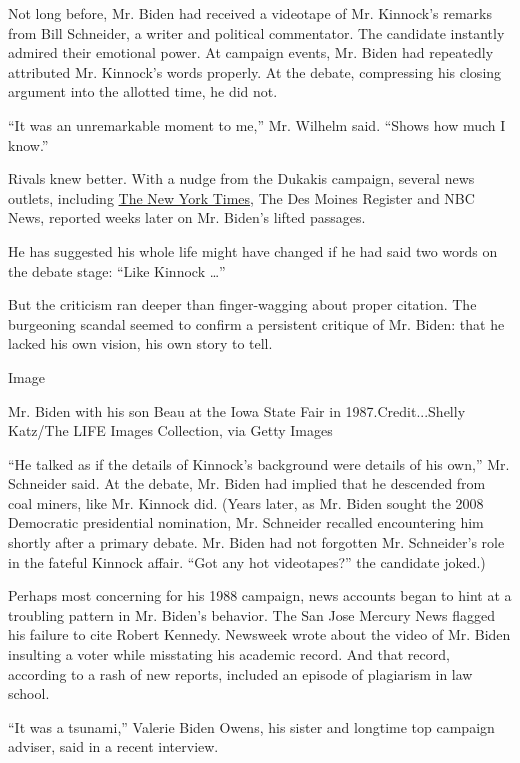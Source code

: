 Not long before, Mr. Biden had received a videotape of Mr. Kinnock's
remarks from Bill Schneider, a writer and political commentator. The
candidate instantly admired their emotional power. At campaign events,
Mr. Biden had repeatedly attributed Mr. Kinnock's words properly. At the
debate, compressing his closing argument into the allotted time, he did
not.

``It was an unremarkable moment to me,'' Mr. Wilhelm said. ``Shows how
much I know.''

Rivals knew better. With a nudge from the Dukakis campaign, several news
outlets, including
\href{https://www.nytimes3xbfgragh.onion/1987/09/12/us/biden-s-debate-finale-an-echo-from-abroad.html}{The
New York Times}, The Des Moines Register and NBC News, reported weeks
later on Mr. Biden's lifted passages.

He has suggested his whole life might have changed if he had said two
words on the debate stage: ``Like Kinnock \ldots{}''

But the criticism ran deeper than finger-wagging about proper citation.
The burgeoning scandal seemed to confirm a persistent critique of Mr.
Biden: that he lacked his own vision, his own story to tell.

Image

Mr. Biden with his son Beau at the Iowa State Fair in
1987.Credit...Shelly Katz/The LIFE Images Collection, via Getty Images

``He talked as if the details of Kinnock's background were details of
his own,'' Mr. Schneider said. At the debate, Mr. Biden had implied that
he descended from coal miners, like Mr. Kinnock did. (Years later, as
Mr. Biden sought the 2008 Democratic presidential nomination, Mr.
Schneider recalled encountering him shortly after a primary debate. Mr.
Biden had not forgotten Mr. Schneider's role in the fateful Kinnock
affair. ``Got any hot videotapes?'' the candidate joked.)

Perhaps most concerning for his 1988 campaign, news accounts began to
hint at a troubling pattern in Mr. Biden's behavior. The San Jose
Mercury News flagged his failure to cite Robert Kennedy. Newsweek wrote
about the video of Mr. Biden insulting a voter while misstating his
academic record. And that record, according to a rash of new reports,
included an episode of plagiarism in law school.

``It was a tsunami,'' Valerie Biden Owens, his sister and longtime top
campaign adviser, said in a recent interview.

